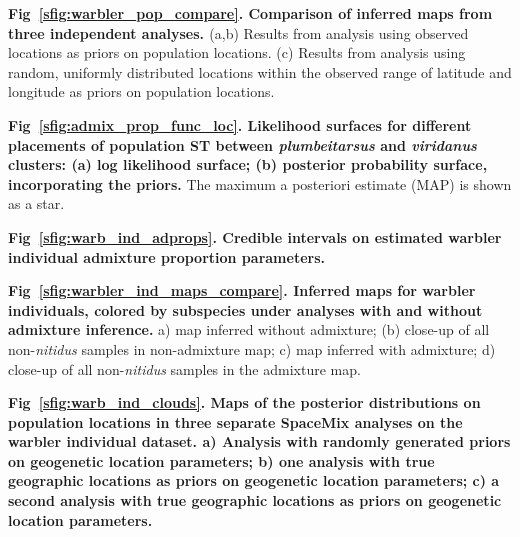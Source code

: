 \documentclass[10pt,letterpaper]{article}
\begin{document}
\label{warbler_pop_compare}
{\bf{Fig\ \ref{sfig:warbler_pop_compare}. Comparison of inferred maps from three independent analyses.	}} (a,b) Results from analysis using observed locations as priors on population locations.  (c) Results from analysis using random, uniformly distributed locations within the observed range of latitude and longitude as priors on population locations.

\label{admix_prop_func_loc_lnl}
{\bf{Fig\ \ref{sfig:admix_prop_func_loc}. Likelihood surfaces for different placements of population ST between \textit{plumbeitarsus} and \textit{viridanus} clusters: (a) log likelihood surface; (b) posterior probability surface, incorporating the priors.}}  The maximum a posteriori estimate (MAP) is shown as a star. 

\label{warb_ind_adprops}
{\bf{Fig\ \ref{sfig:warb_ind_adprops}. Credible intervals on estimated warbler individual admixture proportion parameters.}}

\label{warbler_ind_maps_compare}
{\bf{Fig\ \ref{sfig:warbler_ind_maps_compare}. Inferred maps for warbler individuals, colored by subspecies under analyses with and without admixture inference.}} a) map inferred without admixture; (b) close-up of all non-\textit{nitidus} samples in non-admixture map; c) map inferred with admixture; d) close-up of all non-\textit{nitidus} samples in the admixture map.

\label{warb_ind_clouds}
{\bf{Fig\ \ref{sfig:warb_ind_clouds}. Maps of the posterior distributions on population locations in three separate SpaceMix analyses on the warbler individual dataset. a) Analysis with randomly generated priors on geogenetic location parameters; b) one analysis with true geographic locations as priors on geogenetic location parameters; c) a second analysis with true geographic locations as priors on geogenetic location parameters.}}
\end{document}

